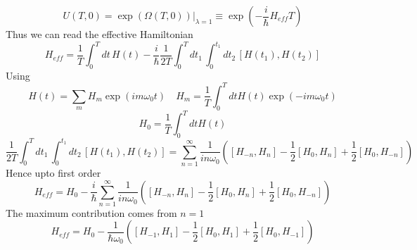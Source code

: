 \documentclass[aps,prb,onecolumn,notitlepage,showpacs,floatfix,superscriptaddress]{revtex4-1}
\begin{document}
\begin{equation}
U(T,0) = \exp\left( \Omega (T,0)\right) \vert_{\lambda=1} \equiv \exp\left( -\dfrac{i}{\hbar} H_{eff} T \right)
\end{equation}
Thus we can read the effective Hamiltonian 
\begin{equation}
H_{eff} = \dfrac{1}{T} \int_0^T dt \, H(t) -\dfrac{i}{\hbar} \dfrac{1}{2T} \int_0^T dt_1 \, \int_0^{t_1} dt_2 \, [H(t_1),H(t_2)]
\end{equation}
Using
\begin{equation}
H(t)=\sum_{m} H_{m} \exp\left( im\omega_0 t\right) \quad H_m = \dfrac{1}{T}\int_0^T dt H(t) \exp\left( -im\omega_0 t\right)
\end{equation}
\begin{equation}
H_0 = \dfrac{1}{T}\int_0^T dt H(t) 
\end{equation}
\begin{equation}
 \dfrac{1}{2T} \int_0^T dt_1 \, \int_0^{t_1} dt_2 \, [H(t_1),H(t_2)] = \sum_{n=1}^\infty \dfrac{1}{i n \omega_0} \left( [H_{-n}, H_n] -\dfrac{1}{2}[H_{0}, H_n]+\dfrac{1}{2}[H_{0}, H_{-n}] \right)
\end{equation}
Hence upto first order 
\begin{equation}
H_{eff} = H_0 -\dfrac{i}{\hbar} \sum_{n=1}^\infty \dfrac{1}{i n \omega_0} \left( [H_{-n}, H_n] -\dfrac{1}{2}[H_{0}, H_n]+\dfrac{1}{2}[H_{0}, H_{-n}] \right)
\end{equation}
The maximum contribution comes from $n=1$
\begin{equation}
H_{eff} = H_0 - \dfrac{1}{ \hbar \omega_0} \left( [H_{-1}, H_1] -\dfrac{1}{2}[H_{0}, H_1]+\dfrac{1}{2}[H_{0}, H_{-1}] \right)
\end{equation}
\end{document}
